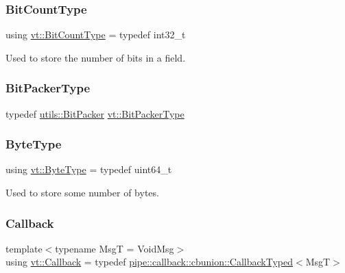 \mbox{\label{namespacevt_acaf7da00eb37dfb0c3479a6a982c30ef}} 
\subsubsection{\texorpdfstring{Bit\+Count\+Type}{BitCountType}}
{\footnotesize\ttfamily using \hyperlink{namespacevt_acaf7da00eb37dfb0c3479a6a982c30ef}{vt\+::\+Bit\+Count\+Type} = typedef int32\+\_\+t}



Used to store the number of bits in a field. 

\mbox{\label{namespacevt_a80d5091925c65efd88ca7f49fe1d633b}} 
\subsubsection{\texorpdfstring{Bit\+Packer\+Type}{BitPackerType}}
{\footnotesize\ttfamily typedef \hyperlink{structvt_1_1utils_1_1_bit_packer}{utils\+::\+Bit\+Packer} \hyperlink{namespacevt_a80d5091925c65efd88ca7f49fe1d633b}{vt\+::\+Bit\+Packer\+Type}}

\mbox{\label{namespacevt_aab8d55968084610ce3b17057981e9300}} 
\subsubsection{\texorpdfstring{Byte\+Type}{ByteType}}
{\footnotesize\ttfamily using \hyperlink{namespacevt_aab8d55968084610ce3b17057981e9300}{vt\+::\+Byte\+Type} = typedef uint64\+\_\+t}



Used to store some number of bytes. 

\mbox{\label{namespacevt_a36db99df4c973d48b1118a293fff533f}} 
\subsubsection{\texorpdfstring{Callback}{Callback}}
{\footnotesize\ttfamily template$<$typename MsgT  = Void\+Msg$>$ \\
using \hyperlink{namespacevt_a36db99df4c973d48b1118a293fff533f}{vt\+::\+Callback} = typedef \hyperlink{structvt_1_1pipe_1_1callback_1_1cbunion_1_1_callback_typed}{pipe\+::callback\+::cbunion\+::\+Callback\+Typed}$<$MsgT$>$}

